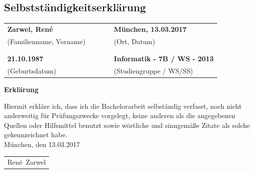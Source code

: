 \documentclass[12pt,a4paper,bibliography=totocnumbered,listof=totocnumbered]{scrartcl}
\numberwithin{figure}{section} %
\numberwithin{table}{section} %
\begin{document}
\todototoc
\listoftodos
\pagebreak
\begin{appendix}
\setcounter{page}{1}

\thispagestyle{empty}
\section*{Selbstständigkeitserklärung}
{}

\vspace{2cm}
\begin{table}[!h]
	\centering
	\begin{tabular}{p{0.5\linewidth}p{0.5\linewidth}}
		\textbf{Zarwel, René} & \textbf{München, 13.03.2017} \\ 
		(Familienname, Vorname) & (Ort, Datum)\\
		\\ \\
		\textbf{21.10.1987} & \textbf{Informatik - 7B / WS - 2013} \\ 
		(Geburtsdatum) & (Studiengruppe / WS/SS)\\
	\end{tabular} 
\end{table}
\vspace{2cm}

\begin{center}
	\Large
	\textbf{Erklärung}
\end{center}

\vspace{1cm}
Hiermit erkläre ich, dass ich die Bachelorarbeit selbständig verfasst, noch nicht anderweitig für Prüfungszwecke vorgelegt, keine anderen als die angegebenen Quellen oder Hilfsmittel benutzt sowie wörtliche und sinngemäße Zitate als solche gekennzeichnet habe.\\[4ex]

München, den 13.03.2017\\[6ex]
\flushleft
\newlength\us
\settowidth{\us}{-René~Zarwel-}
\begin{tabular}{p{\us}}\hline
	\centering\footnotesize René~Zarwel
\end{tabular}
\pagebreak

\end{appendix}
\end{document}
